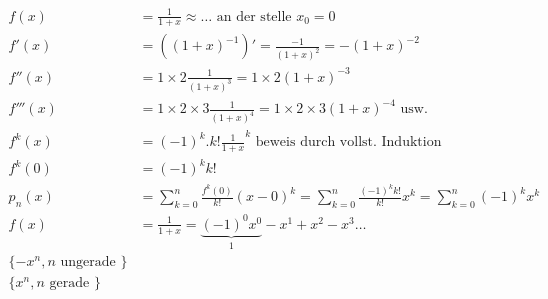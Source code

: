 \begin{align*}
f(x) &= \frac{1}{1+x} \approx \dots \text{ an der stelle } x_0 = 0\\
f'(x) &= ((1+x)^{-1})' = \frac{-1}{(1+x)^2} = -(1+x)^{-2}\\
f''(x) &= 1 \times 2 \frac{1}{(1+x)^3} = 1 \times 2(1+x)^{-3}\\
f'''(x) &= 1 \times 2 \times 3 \frac{1}{(1+x)^4} = 
1 \times 2 \times 3 (1+x)^{-4} \text{ usw.}\\
f^k(x) &= (-1)^k.k!\frac{1}{1+x}^k \text{ beweis durch vollst. Induktion }\\
f^k(0) &= (-1)^k k!\\
p_n(x) &= \sum_{k=0}^{n}{\frac{f^k(0)}{k!}} (x-0)^k =
\sum_{k=0}^{n}{\frac{(-1)^k k!}{k!}} x^k = 
\sum_{k=0}^{n}{(-1)^k x^k}\\
f(x) &= \frac{1}{1+x} = \underbrace{(-1)^0 x^0}_{1}-x^1 + x^2 - x^3 \dots \\
\{ -x^n , n \text{ ungerade } \} \\
\{ x^n , n \text{ gerade } \}
\end{align*}
